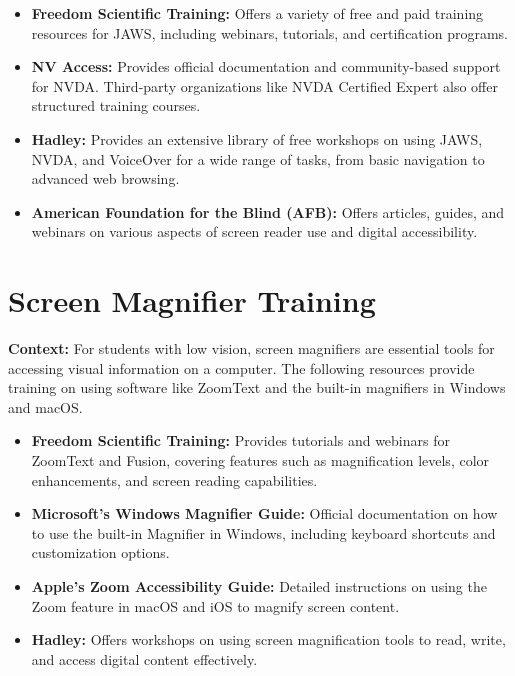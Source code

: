 \begin{itemize}
	\item \textbf{Freedom Scientific Training:} Offers a variety of free and paid training resources for JAWS, including webinars, tutorials, and certification programs.
	\item \textbf{NV Access:} Provides official documentation and community-based support for NVDA. Third-party organizations like NVDA Certified Expert also offer structured training courses.
	\item \textbf{Hadley:} Provides an extensive library of free workshops on using JAWS, NVDA, and VoiceOver for a wide range of tasks, from basic navigation to advanced web browsing.
	\item \textbf{American Foundation for the Blind (AFB):} Offers articles, guides, and webinars on various aspects of screen reader use and digital accessibility.
\end{itemize}

\section[Screen Magnifier Training]{Screen Magnifier Training}\label{app4:magnifier-training}

\noindent
\textbf{Context:} For students with low vision, screen magnifiers are essential tools for accessing visual information on a computer. The following resources provide training on using software like ZoomText and the built-in magnifiers in Windows and macOS.

\begin{itemize}
	\item \textbf{Freedom Scientific Training:} Provides tutorials and webinars for ZoomText and Fusion, covering features such as magnification levels, color enhancements, and screen reading capabilities.
	\item \textbf{Microsoft's Windows Magnifier Guide:} Official documentation on how to use the built-in Magnifier in Windows, including keyboard shortcuts and customization options.
	\item \textbf{Apple's Zoom Accessibility Guide:} Detailed instructions on using the Zoom feature in macOS and iOS to magnify screen content.
	\item \textbf{Hadley:} Offers workshops on using screen magnification tools to read, write, and access digital content effectively.
\end{itemize}

